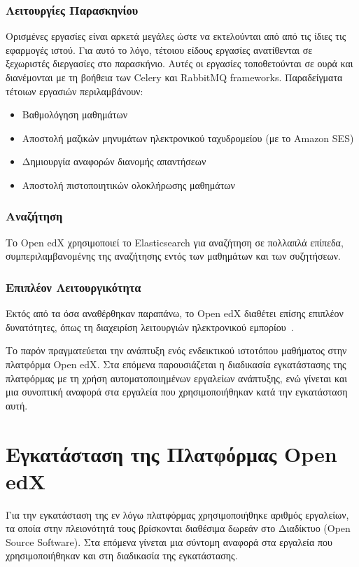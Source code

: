 \documentclass[12pt]{report}
\begin{document}
\subsection{Λειτουργίες Παρασκηνίου}
Ορισμένες εργασίες είναι αρκετά μεγάλες ώστε να εκτελούνται από από τις ίδιες τις εφαρμογές ιστού. Για αυτό το λόγο, τέτοιου είδους εργασίες ανατίθενται σε ξεχωριστές διεργασίες στο παρασκήνιο. Αυτές οι εργασίες τοποθετούνται σε ουρά και διανέμονται με τη βοήθεια των \textlatin{Celery} και \textlatin{RabbitMQ frameworks}. Παραδείγματα τέτοιων εργασιών περιλαμβάνουν:
\begin{itemize}
  \item Βαθμολόγηση μαθημάτων
  \item Αποστολή μαζικών μηνυμάτων ηλεκτρονικού ταχυδρομείου (με το \textlatin{Amazon SES})
  \item Δημιουργία αναφορών διανομής απαντήσεων
  \item Αποστολή πιστοποιητικών ολοκλήρωσης μαθημάτων
\end{itemize}

\subsection{Αναζήτηση}
Το \textlatin{Open edX} χρησιμοποιεί το \textlatin{Elasticsearch} για αναζήτηση σε πολλαπλά επίπεδα, συμπεριλαμβανομένης της αναζήτησης εντός των μαθημάτων και των συζητήσεων.

\subsection{Επιπλέον Λειτουργικότητα}
Εκτός από τα όσα αναθέρθηκαν παραπάνω, το \textlatin{Open edX} διαθέτει επίσης επιπλέον δυνατότητες, όπως τη διαχειρίση λειτουργιών ηλεκτρονικού εμπορίου~\cite{edx_arch}.

Το παρόν πραγματεύεται την ανάπτυξη ενός ενδεικτικού ιστοτόπου μαθήματος στην πλατφόρμα \textlatin{Open edX}. Στα επόμενα παρουσιάζεται η διαδικασία εγκατάστασης της πλατφόρμας με τη χρήση αυτοματοποιημένων εργαλείων ανάπτυξης, ενώ γίνεται και μια συνοπτική αναφορά στα εργαλεία που χρησιμοποιήθηκαν κατά την εγκατάσταση αυτή.

\chapter{Εγκατάσταση της Πλατφόρμας \textlatin{Open edX}}\label{ch3}
Για την εγκατάσταση της εν λόγω πλατφόρμας χρησιμοποιήθηκε αριθμός εργαλείων, τα οποία στην πλειονότητά τους βρίσκονται διαθέσιμα δωρεάν στο Διαδίκτυο (\textlatin{Open Source Software}). Στα επόμενα γίνεται μια σύντομη αναφορά στα εργαλεία που χρησιμοποιήθηκαν και στη διαδικασία της εγκατάστασης.
\end{document}
